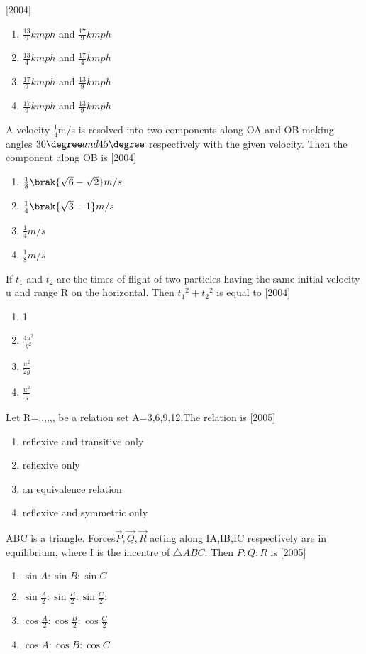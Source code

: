 \hfill{[2004]}
\begin{enumerate}
\item $\frac{13}{9}kmph$ and $\frac{17}{9}kmph$
\item $\frac{13}{4}kmph$ and $\frac{17}{4}kmph$
\item $\frac{17}{9}kmph$ and $\frac{13}{9}kmph$
\item $\frac{17}{9}kmph$ and $\frac{13}{9}kmph$
\end{enumerate}
\item A velocity $\frac{1}{4}$m/s is resolved into two components along OA and OB making angles $30\degree and 45\degree$ respectively with the given velocity. Then the component along OB is
\hfill{[2004]}
\begin{enumerate}
\item $\frac{1}{8}\brak{\sqrt{6}-\sqrt{2}}m/s$
\item $\frac{1}{4}\brak{\sqrt{3}-1}m/s$
\item $\frac{1}{4} m/s$
\item $\frac{1}{8} m/s$
\end{enumerate}
\item If $t_1$ and $t_2$ are the times of flight of two particles having the same initial velocity u and range R on the horizontal. Then $ {t_1}^2 + {t_2}^2$ is equal to
\hfill{[2004]}
\begin{enumerate}
\item 1
\item $\frac{4{u}^2}{{g}^2}$
\item $\frac{{u}^2}{2g}$
\item $\frac{{u}^2}{g}$
\end{enumerate}
\item
Let R={,,,,,,} be a relation set A={3,6,9,12}.The relation is
\hfill{[2005]}
\begin{enumerate}
\item reflexive and transitive only
\item reflexive only
\item an equivalence relation
\item reflexive and symmetric only
\end{enumerate}
\item ABC is a triangle. Forces$\vec{P},\vec{Q},\vec{R}$ acting along IA,IB,IC respectively are in equilibrium, where I is the incentre of $\triangle ABC$. Then $P\colon Q \colon R$ is
\hfill{[2005]}
\begin{enumerate}
\item $\sin {A} \colon \sin {B} \colon \sin {C}$
\item $\sin{\frac{A}{2}}\colon \sin{\frac{B}{2}}\colon \sin{\frac{C}{2}}\colon$
\item $\cos{\frac{A}{2}}\colon \cos{\frac{B}{2}}\colon \cos{\frac{C}{2}}$
\item $\cos {A} \colon \cos{B}\colon \cos{C}$
\end{enumerate}
